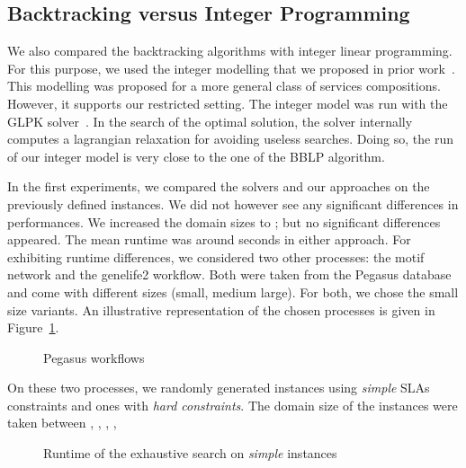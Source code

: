 \documentclass[a4paper]{article}
\begin{document}
\subsection{Backtracking versus Integer Programming}

We also compared the backtracking algorithms with integer linear programming. For this 
purpose, we used the integer modelling that we proposed in prior work~\cite{JISA}. This modelling 
was proposed for a more general class of services compositions. However, it supports our 
restricted setting. The integer model was run with the GLPK solver~\cite{GLPK}. In the search of 
the optimal solution, the solver internally computes a lagrangian relaxation for avoiding useless searches. 
Doing so, the run of our integer model is very close to the one of the BBLP algorithm.

In the first experiments, we compared the solvers and our approaches on the previously defined 
instances. We did not however see any significant differences in performances. We increased 
the domain sizes to ; but no significant differences appeared. The mean runtime was around  seconds 
in either approach. For exhibiting runtime differences, we considered two other processes: the motif 
network and the genelife2 workflow. Both were taken from the Pegasus database~\cite{Pegasus} and come with 
different sizes (small, medium large). For both, we chose the small size variants. An illustrative representation 
of the chosen processes is given in Figure~\ref{Workflow}. 

\begin{figure}[ht]
\centering
{}

\caption{Pegasus workflows}
\label{Workflow}
\end{figure}

On these two processes, we randomly generated  instances using {\it simple} SLAs constraints and 
  ones with {\it hard constraints}. The domain size of the instances were taken between , , , , 


\begin{figure}[ht]
\centering
{}


\caption{Runtime of the exhaustive search on {\it simple} instances}
\label{Time-ss-Exh}
\end{figure}
\end{document}
